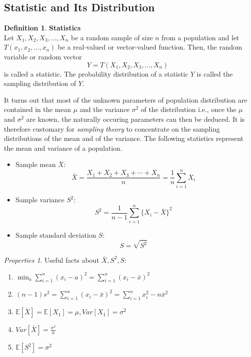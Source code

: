 \documentclass[twoside]{article}
\theoremstyle{definition}
\newtheorem{definition}{Definition}[section]
\theoremstyle{remark}
\newtheorem{properties}[theorem]{Properties}
\theoremstyle{remark}
\begin{document}
\clearpage
\subsection{Statistic and Its Distribution}
\begin{definition}{\bf Statistics} \\
  Let $X_1, X_2, X_3, \ldots, X_n$ be a random sample of size $n$ from a
  population and let $T(x_1, x_2, \ldots, x_n)$ be a real-valued or
  vector-valued function. Then, the random variable or random vector
  \begin{equation}
    Y=T(X_1, X_2, X_3, \ldots, X_n)
  \end{equation}
  is called a statistic. The probability distribution of a statistic $Y$
  is called the sampling distribution of $Y$.
\end{definition}



It turns out that most of the unknown parameters of population distribution
are contained in the mean $\mu$ and the variance $\sigma^2$ of the distribution
i.e., once the $\mu$ and $\sigma^2$ are known, the naturally occuring parameters
can then be deduced. It is therefore customary for \textit{sampling theory}
to concentrate on the sampling distributions of the mean and of the variance.
The following statistics represent the mean and variance of a population.
\begin{itemize}
  \item Sample mean $\bar{X}$:
  \begin{equation}
    \bar{X} = \frac{X_1 + X_2 + X_3 + \cdots + X_n}{n}
    = \frac{1}{n} \sum_{i=1}^{n} X_i
  \end{equation}
  \item Sample variance $S^2$:
  \begin{equation}
    S^2 = \frac{1}{n-1} \sum_{i=1}^{n} {\{X_i-\bar{X}\}}^2
  \end{equation}
  \item Sample standard deviation $S$:
  \begin{equation}
    S = \sqrt{S^2}
  \end{equation}
\end{itemize}

\begin{properties}
  Useful facts about $\bar{X}, S^2, S$:
  \begin{enumerate}
    \item $\min_{a} \sum_{i=1}^{n} {(x_i - a)}^2 = \sum_{i=1}^{n} {(x_i - \bar{x})}^2$ \\
    \item $(n-1)s^2 = \sum_{i=1}^{n} {(x_i - \bar{x})}^2  = \sum_{i=1}^{n} x_i^2 - n{\bar{x}}^2$
    \item $\mathbb{E}[\bar{X}] = \mathbb{E}[X_1] = \mu, Var[X_1] = \sigma^2$
    \item $Var[\bar{X}] = \frac{\sigma^2}{n}$
    \item $\mathbb{E}[S^2] = \sigma^2$
  \end{enumerate}
\end{properties}
\end{document}
